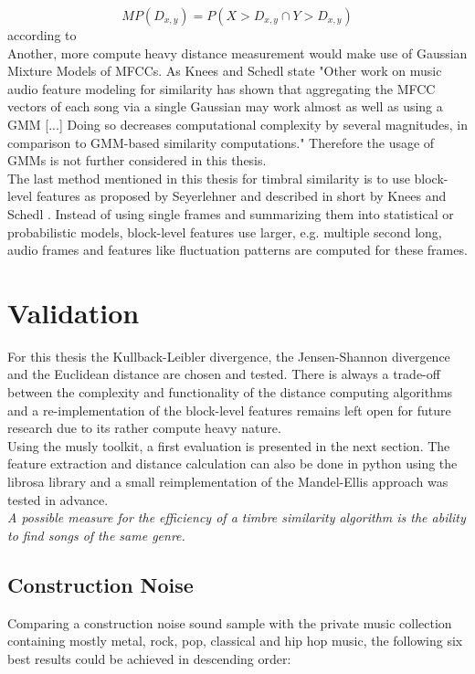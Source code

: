 \begin{equation} \label{eq:mp2}
MP(D_{x,y}) = P(X > D_{x,y} \cap Y > D_{x,y})
\end{equation}
according to \cite[p. 80]{knees1}
\ \\
Another, more compute heavy distance measurement would make use of Gaussian Mixture Models of MFCCs. As Knees and Schedl state "Other work on music audio feature modeling for similarity has shown that aggregating the MFCC vectors of each song via a single Gaussian may work almost as well as using a GMM [...] Doing so decreases computational complexity by several magnitudes, in comparison to GMM-based similarity computations." \cite[p. 65]{knees1} Therefore the usage of GMMs is not further considered in this thesis.
\ \\
The last method mentioned in this thesis for timbral similarity is to use block-level features as proposed by Seyerlehner \cite{seyerlehnerblock} and described in short by Knees and Schedl \cite[p. 67]{knees1}. 
Instead of using single frames and summarizing them into statistical or probabilistic models, block-level features use larger, e.g. multiple second long, audio frames and features like fluctuation patterns are computed for these frames. 

\section{Validation}

For this thesis the Kullback-Leibler divergence, the Jensen-Shannon divergence and the Euclidean distance are chosen and tested. There is always a trade-off between the complexity and functionality of the distance computing algorithms and a re-implementation of the block-level features remains left open for future research due to its rather compute heavy nature.\\
Using the musly toolkit, a first evaluation is presented in the next section. The feature extraction and distance calculation can also be done in python using the librosa library and a small reimplementation of the Mandel-Ellis approach was tested in advance.\\
\textit{A possible measure for the efficiency of a timbre similarity algorithm is the ability to find songs of the same genre.}

\subsection{Construction Noise}
Comparing a construction noise sound sample with the private music collection containing mostly metal, rock, pop, classical and hip hop music, the following six best results could be achieved in descending order: 

